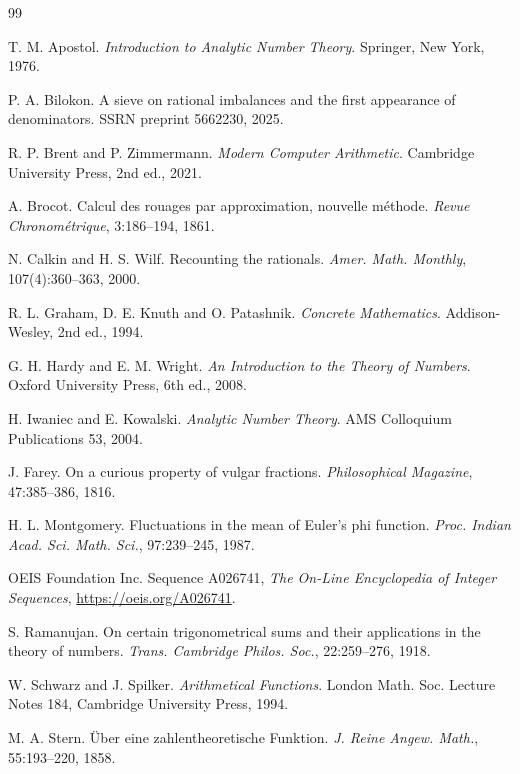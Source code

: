 \documentclass[11pt,a4paper]{article}
\theoremstyle{plain}
\theoremstyle{definition}
\theoremstyle{remark}
\begin{document}
\begin{thebibliography}{99}

 T. M. Apostol.
  \emph{Introduction to Analytic Number Theory}. Springer, New York, 1976.

 P. A. Bilokon.
  A sieve on rational imbalances and the first appearance of denominators.
  SSRN preprint 5662230, 2025.

 R. P. Brent and P. Zimmermann.
  \emph{Modern Computer Arithmetic}. Cambridge University Press, 2nd ed., 2021.

 A. Brocot.
  Calcul des rouages par approximation, nouvelle m\'ethode.
  \emph{Revue Chronom\'etrique}, 3:186--194, 1861.

 N. Calkin and H. S. Wilf.
  Recounting the rationals. \emph{Amer. Math. Monthly}, 107(4):360--363, 2000.

 R. L. Graham, D. E. Knuth and O. Patashnik.
  \emph{Concrete Mathematics}. Addison-Wesley, 2nd ed., 1994.

 G. H. Hardy and E. M. Wright.
  \emph{An Introduction to the Theory of Numbers}. Oxford University Press,
  6th ed., 2008.

 H. Iwaniec and E. Kowalski.
  \emph{Analytic Number Theory}. AMS Colloquium Publications 53, 2004.

 J. Farey.
  On a curious property of vulgar fractions.
  \emph{Philosophical Magazine}, 47:385--386, 1816.

 H. L. Montgomery.
  Fluctuations in the mean of Euler's phi function.
  \emph{Proc. Indian Acad. Sci. Math. Sci.}, 97:239--245, 1987.

 OEIS Foundation Inc.
  Sequence A026741, \emph{The On-Line Encyclopedia of Integer Sequences},
  \url{https://oeis.org/A026741}.

 S. Ramanujan.
  On certain trigonometrical sums and their applications in the theory of
  numbers. \emph{Trans. Cambridge Philos. Soc.}, 22:259--276, 1918.

 W. Schwarz and J. Spilker.
  \emph{Arithmetical Functions}. London Math. Soc. Lecture Notes 184,
  Cambridge University Press, 1994.

 M. A. Stern.
  \"Uber eine zahlentheoretische Funktion.
  \emph{J. Reine Angew. Math.}, 55:193--220, 1858.

\end{thebibliography}
\end{document}
